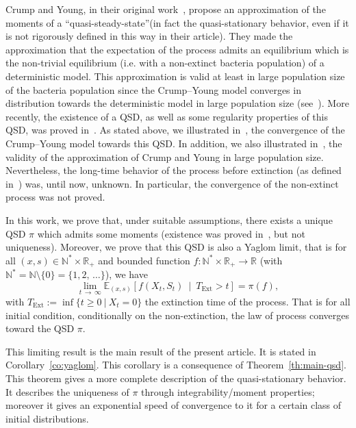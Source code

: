 \documentclass[AHL,Unicode,longabstracts,published]{cedram}
\newcommand{\RR}{\mathbb{R}}
\newcommand{\NN}{\mathbb{N}}
\newcommand{\EE}{\mathbb{E}}
\newcommand{\Text}{T_{\mathrm{Ext}}}
\newcommand{\1}{\mathbf{1}}
\begin{document}
Crump and Young, in their original work~\cite{CY79}, propose an approximation of the moments of a ``quasi-steady-state''(in fact the quasi-stationary behavior, even if it is not rigorously defined in this way in their article). They made the approximation that the expectation of the process admits an equilibrium which is the non-trivial equilibrium (i.e. with a non-extinct bacteria population) of a deterministic model. This approximation is valid at least in large population size of the bacteria population since the Crump--Young model converges in distribution towards the deterministic model in large population size (see~\cite{CF17}). More recently, the existence of a QSD, as well as some regularity properties of this QSD, was proved in~\cite{CMMS}. As stated above, we illustrated in~\cite{CF17}, the convergence of the Crump--Young model towards this QSD. In addition, we also illustrated in~\cite{CF17}, the validity of the approximation of Crump and Young in large population size. Nevertheless, the long-time behavior of the process before extinction (as defined in~\cite{CMS13,MV12,VP13}) was, until now, unknown. In particular, the convergence of the non-extinct process was not proved.


In this work, we prove that, under suitable assumptions, there exists a unique QSD $\pi$ which admits some moments (existence was proved in~\cite{CMMS}, but not uniqueness). Moreover, we prove that this QSD is also a Yaglom limit, that is for all $(x,s) \in \NN^* \times \RR_+$ and bounded function $f:\NN^{*}\times \RR_+\to \RR$ (with $\NN^*=\NN\setminus\{0\} = \{1,2,\,\dots\}$), we have
\[
\lim_{t\,\to\,\infty} \EE_{(x,s)} \left[f(X_t,S_t) \ \middle| \ \Text>t\right] = \pi(f),
\]
with $\Text:=\inf\{t\geq 0 \ | \ X_t=0 \}$ the extinction time of the process. That is for all initial condition, conditionally on the non-extinction, the law of process converges toward the QSD $\pi$.

This limiting result is the main result of the present article. It is stated in Corollary~\ref{co:yaglom}. This corollary is a consequence of Theorem~\ref{th:main-qsd}. This theorem gives a more complete description of the quasi-stationary behavior. It describes the uniqueness of $\pi$ through integrability/moment properties; moreover it gives an exponential speed of convergence to it for a certain class of initial distributions.
\end{document}
